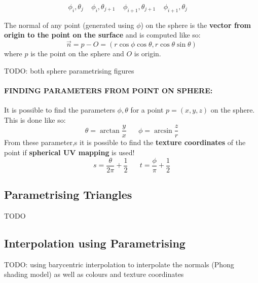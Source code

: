 \documentclass{article}
\begin{document}
\begin{equation}
	\phi_i,\theta_j \;\;\;\;
	\phi_i,\theta_{j+1} \;\;\;\;
	\phi_{i+1},\theta_{j+1} \;\;\;\;
	\phi_{i+1},\theta_j \;\;\;\;	
	\label{eq:sphere-quad-phi-theta-combinations}
\end{equation}

The normal of any point (generated using $\phi$) on the sphere is the \textbf{vector from origin to the point on the surface} and is computed like so:
\begin{equation}
	\vec{n} = p - O = (r \cos \phi \cos \theta, r \cos \theta \sin \theta)
	\label{eq:sphere-normal}
\end{equation}
where $p$ is the point on the sphere and $O$ is origin.

TODO: both sphere parametrising figures

\paragraph{\textbf{FINDING PARAMETERS FROM POINT ON SPHERE}: } It is possible to find the parameters $\phi,\theta$ for a point $p = (x, y, z)$ on the sphere. This is done like so:
\begin{equation}
	\theta = \arctan \frac{y}{x} \;\;\;\;\;\;
	\phi = \arcsin \frac{z}{r}
	\label{eq:sphere-parameters-from-point}	
\end{equation}
From these parameter,s it is possible to find the \textbf{texture coordinates} of the point if \textbf{spherical UV mapping} is used!
\begin{equation}
	s = \frac{\theta}{2\pi} + \frac{1}{2} \;\;\;\;\;\;
	t = \frac{\phi}{\pi} + \frac{1}{2}
	\label{eq:sphere-parameters-uv-coords}
\end{equation}
\paragraph{}

\subsection{Parametrising Triangles}

TODO

\subsection{Interpolation using Parametrising}

TODO: using barycentric interpolation to interpolate the normals (Phong shading model) as well as colours and texture coordinates
\end{document}
